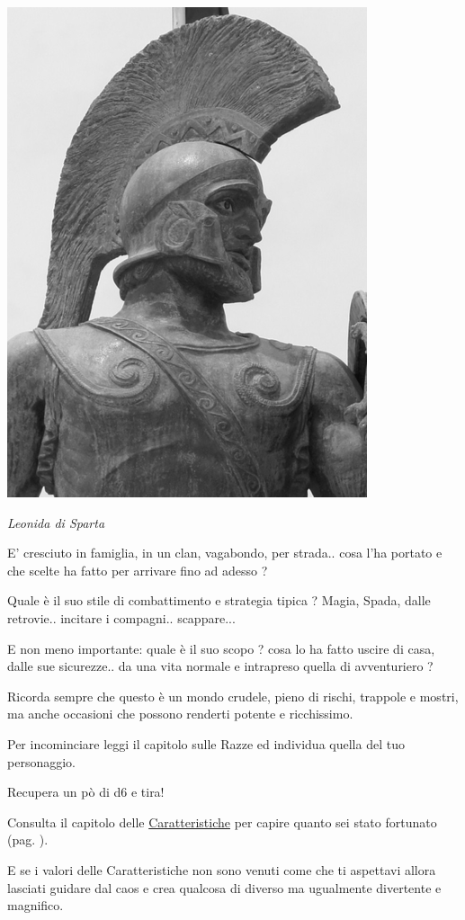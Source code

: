 \begin{multicols}{2}
\begin{center}
 \includegraphics[width=0.7\linewidth]{immagini/Leonidas_I_of_Sparta.png}

\emph{Leonida di Sparta}
\end{center}

E' cresciuto in famiglia, in un clan, vagabondo, per strada.. cosa l'ha portato e che scelte ha fatto per arrivare fino ad adesso ?

Quale è il suo stile di combattimento e strategia tipica ? Magia, Spada, dalle retrovie.. incitare i compagni.. scappare...

E non meno importante: quale è il suo scopo ? cosa lo ha fatto uscire di casa, dalle sue sicurezze.. da una vita normale e intrapreso quella di avventuriero ?

Ricorda sempre che questo è un mondo crudele, pieno di rischi, trappole e mostri, ma anche occasioni che possono renderti potente e ricchissimo.

Per incominciare leggi il capitolo sulle Razze ed individua quella del tuo personaggio.

Recupera un pò di d6 e tira!

Consulta il capitolo delle \hyperlink{assegnazione.punteggi.caratteristica}{Caratteristiche} per capire quanto sei stato fortunato (pag. \pageref{assegnazionepunteggicaratteristica}).

E se i valori delle Caratteristiche non sono venuti come che ti aspettavi allora lasciati guidare dal caos e crea qualcosa di diverso ma ugualmente divertente e magnifico.


\end{multicols}
